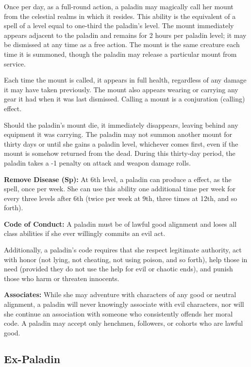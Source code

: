 Once per day, as a full-round action, a paladin may magically call her mount from 
the celestial realms in which it resides. This ability is the equivalent of a spell 
of a level equal to one-third the paladin's level. The mount immediately appears 
adjacent to the paladin and remains for 2 hours per paladin level; it may be dismissed 
at any time as a free action. The mount is the same creature each time it is summoned, 
though the paladin may release a particular mount from service.

Each time the mount is called, it appears in full health, regardless of any damage 
it may have taken previously. The mount also appears wearing or carrying any gear 
it had when it was last dismissed. Calling a mount is a conjuration (calling) effect.

Should the paladin's mount die, it immediately disappears, leaving behind any equipment 
it was carrying. The paladin may not summon another mount for thirty days or until 
she gains a paladin level, whichever comes first, even if the mount is somehow 
returned from the dead. During this thirty-day period, the paladin takes a -1 penalty 
on attack and weapon damage rolls.

\textbf{Remove Disease (Sp):} At 6th level, a paladin can produce 
a  effect, as the spell, once per week. She can use this 
ability one additional time per week for every three levels after 6th (twice per 
week at 9th, three times at 12th, and so forth).

\textbf{Code of Conduct:} A paladin must be of lawful good alignment and loses 
all class abilities if she ever willingly commits an evil act.

Additionally, a paladin's code requires that she respect legitimate authority, 
act with honor (not lying, not cheating, not using poison, and so forth), help 
those in need (provided they do not use the help for evil or chaotic ends), and 
punish those who harm or threaten innocents.

\textbf{Associates:} While she may adventure with characters of any good or neutral 
alignment, a paladin will never knowingly associate with evil characters, nor will 
she continue an association with someone who consistently offends her moral code. 
A paladin may accept only henchmen, followers, or cohorts who are lawful good.

\subsection{Ex-Paladin}

